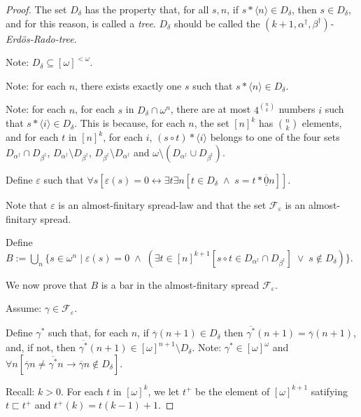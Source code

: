 \documentclass[a4paper]{amsart}
\theoremstyle{plain}
\begin{document}
\begin{proof}
The set $D_\delta$ has the property that, for all $s,n$, if $s\ast\langle n \rangle \in D_\delta$, then $s \in D_\delta$, and for this reason, is called a {\it tree}. $D_\delta $ should be called the \emph{$(k+1,\alpha^\dag, \beta^\dag)$-Erd\"os-Rado-tree}.

Note: $D_\delta\subseteq [\omega]^{<\omega}$. 

Note: for each $n$, there exists exactly one $s$ such that $s\ast\langle n \rangle \in D_\delta$. 

Note: for each $n$, for each $s$ in $D_\delta\cap \omega^n$,  there are at most $4^{\binom{n}{k}}$ numbers $i$ such that $s\ast\langle i \rangle\in D_\delta$. This is because, for each $n$,  the set $[n]^k$ has $\binom{n}{k}$ elements, and  for each  $t$ in $[n]^k$,   for each $i$, $(s\circ t)\ast\langle i \rangle$ belongs to one of the four sets $D_{\alpha^\dag} \cap D_{\beta^\dag}$, $D_{\alpha^\dag} \setminus D_{\beta^\dag}$, $D_{\beta^\dag} \setminus D_{\alpha^\dag}$ and $\omega\setminus(D_{\alpha^\dag} \cup D_{\beta^\dag})$. 

	  
	   
	  Define $\varepsilon$ such that $\forall s[\varepsilon(s) = 0\leftrightarrow \exists t\exists n[t \in D_\delta\;\wedge \;s = t\ast\overline{\underline 0}n]]$. 
	  
	  Note that $\varepsilon$ is an almost-finitary spread-law and that the set $\mathcal{F}_\varepsilon$ is  an almost-finitary spread.
	 
	 Define $B:=\bigcup_n\{s\in \omega^n\mid\varepsilon(s)=0 \;\wedge\;(\exists t\in [n]^{k+1}[s\circ t \in D_{\alpha^\dag}\cap D_{\beta^\dag}]\;\vee\; s \notin D_\delta)\}$.
	 
	   
	   
	   
	    We  now prove that $B$ is a bar in the almost-finitary spread $\mathcal{F}_\varepsilon$.  
	   
	   \smallskip
	  Assume: $\gamma\in\mathcal{F}_\varepsilon$.
	  
	  
	 Define $\gamma^\ast$ such that, for each $n$, if $\overline {\gamma}(n+1) \in D_\delta$ 
	  then $\overline{\gamma^\ast}(n+1) = \overline\gamma(n+1)$, and, if not, then $\overline{\gamma^\ast}(n+1)\in[\omega]^{n+1}\setminus D_\delta$.
	 Note: $\gamma^\ast \in [\omega]^\omega$ and $\forall n[\overline \gamma n \neq \overline{\gamma^*}n\rightarrow\overline \gamma n \notin D_\delta]$.
	 
	Recall: $k>0$.
	For each $t$ in $[\omega]^k$, we let $t^+$ be the element of $[\omega]^{k+1}$ satifying $t\sqsubset t^+$ and $t^+(k)=t(k-1)+1$.
	 

\end{proof}
\end{document}
